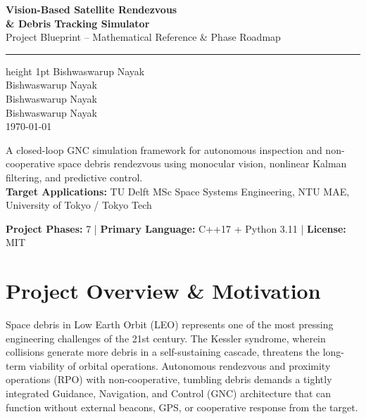 \documentclass[12pt, a4paper]{article}
\begin{document}
\begin{titlepage}
    \centering
    \vspace*{2cm}
    {\Huge\bfseries\color{phaseblue}
        Vision-Based Satellite Rendezvous\\[0.4em]
        \& Debris Tracking Simulator\\[1em]}
    {\Large\color{darkgray} Project Blueprint -- Mathematical Reference \& Phase Roadmap}\\[2em]
    \hrule height 1pt
    \vspace{1.5em}
    {\large Bishwaswarup Nayak}\\[2em]
    {\large Bishwaswarup Nayak}\\[2em]
    {\large Bishwaswarup Nayak}\\[2em]
    {\large Bishwaswarup Nayak}\\[2em]
    {\large \today}\\[3em]

    \begin{tcolorbox}[colback=phaseblue!10, colframe=phaseblue, width=0.85\linewidth]
    \centering\small
    A closed-loop GNC simulation framework for autonomous inspection and
    non-cooperative space debris rendezvous using monocular vision,
    nonlinear Kalman filtering, and predictive control.\\[0.5em]
    \textbf{Target Applications:} TU Delft MSc Space Systems Engineering,
    NTU MAE, University of Tokyo / Tokyo Tech
    \end{tcolorbox}
    \vfill
    \textbf{Project Phases:} 7 \quad|\quad
    \textbf{Primary Language:} C++17 + Python 3.11 \quad|\quad
    \textbf{License:} MIT
\end{titlepage}

\tableofcontents
\clearpage

\section{Project Overview \& Motivation}

Space debris in Low Earth Orbit (LEO) represents one of the most pressing
engineering challenges of the 21st century. The Kessler syndrome, wherein
collisions generate more debris in a self-sustaining cascade, threatens the
long-term viability of orbital operations. Autonomous rendezvous and proximity
operations (RPO) with non-cooperative, tumbling debris demands a tightly
integrated Guidance, Navigation, and Control (GNC) architecture that can
function without external beacons, GPS, or cooperative response from the target.
\end{document}
